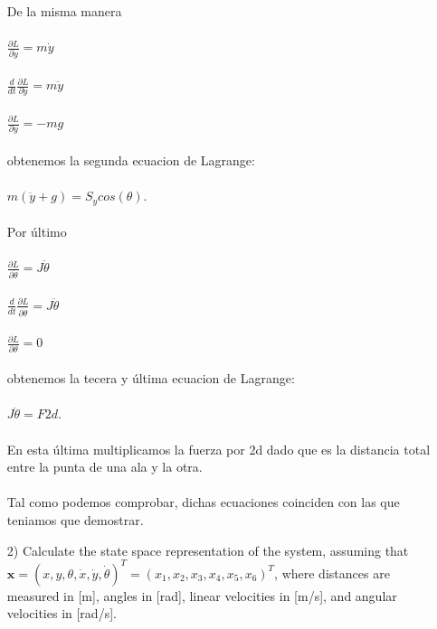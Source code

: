 \documentclass{article}
\begin{document}
\begin{itemize}
De la misma manera\\\\
		$\frac{\partial L}{\partial \dot{y}} = m\dot{y}$\\\\
		$\frac{d}{dt}\frac{\partial L}{\partial \dot{y}} = m\ddot{y}$\\\\
		$\frac{\partial L}{\partial y} = -mg$\\\\
obtenemos la segunda ecuacion de Lagrange: \\\\
		$m(\ddot{y} + g) = S_y cos(\theta)$.\\\\
Por último\\\\
		$\frac{\partial L}{\partial \dot{\theta}} = J\dot{\theta}$\\\\
		$\frac{d}{dt}\frac{\partial L}{\partial \dot{\theta}} = J\ddot{\theta}$\\\\
		$\frac{\partial L}{\partial \theta} = 0$\\\\
obtenemos la tecera y última ecuacion de Lagrange:\\\\
		$J\ddot{\theta} = F2d$.\\\\
En esta última multiplicamos la fuerza por 2d dado que es la distancia total entre la punta de una ala y la otra.\\\\Tal como podemos comprobar, dichas ecuaciones coinciden con las que teniamos que demostrar.

\item[2)] {\color{gray} Calculate the state space representation of the system, assuming that $\mathbf{x} = (x, y, \theta, \dot{x}, \dot{y}, \dot{\theta})^T = ( x_1, x_2, x_3, x_4, x_5, x_6)^T$, where distances are measured in [m], angles in [rad], linear velocities in [m/s], and angular velocities in [rad/s].}


\end{itemize}
\end{document}
